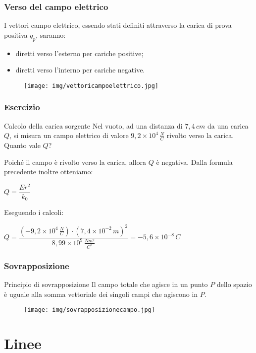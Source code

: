 \documentclass[]{beamer}
\theoremstyle{plain}
\begin{document}
\begin{frame}
\frametitle{Verso del campo elettrico}
I vettori campo elettrico, essendo stati definiti attraverso la carica di prova positiva $ q_p $, saranno:
\begin{itemize}
  \item diretti verso l'esterno per cariche positive;
  \item diretti verso l'interno per cariche negative.
\end{itemize}
\begin{figure}
\texttt{[image: img/vettoricampoelettrico.jpg]}
\end{figure}
\end{frame}


\begin{frame}
\frametitle{Esercizio}

  \begin{exampleblock}{Calcolo della carica sorgente}
{\small Nel vuoto, ad una distanza di $ 7,4 \, cm $ da una carica $ Q $, si misura un campo elettrico di valore $ 9,2 \times 10^{4} \, \frac{N}{C} $ rivolto verso la carica. Quanto vale $ Q $?}
\end{exampleblock}
  \pause
  Poiché il campo è rivolto verso la carica, allora $ Q $ è negativa.{\pause} Dalla formula precedente inoltre otteniamo:
  \begin{center}
  $ Q = \dfrac{Er^2}{k_0} $
  \end{center}\pause
Eseguendo i calcoli:
  \begin{center}
  $ Q = \dfrac{ \left( -9,2 \times 10^4 \, \frac{N}{C}\right) \cdot ( 7,4 \times 10^{-2} \, m)^2 }{8,99 \times10^9 \, \frac{Nm^2}{C^2}} = - 5,6 \times 10^{-8} \, C $
  \end{center}
\end{frame}




\begin{frame}
\frametitle{Sovrapposizione}
\begin{block}{Principio di sovrapposizione}
Il campo totale che agisce in un punto $ P $ dello spazio è uguale alla \alert{somma vettoriale} dei singoli campi che agiscono in $ P $.
\end{block}
\begin{figure}
\texttt{[image: img/sovrapposizionecampo.jpg]}
\end{figure}
\end{frame}


\section{Linee}
\end{document}
